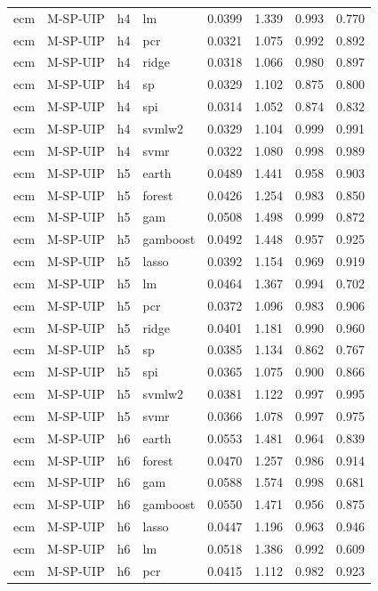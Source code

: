 \begin{ThreePartTable}
\begin{longtable}[t]{llclcccc}
ecm & M-SP-UIP & h4 & lm & 0.0399 & 1.339 & 0.993 & 0.770\\
ecm & M-SP-UIP & h4 & pcr & 0.0321 & 1.075 & 0.992 & 0.892\\
ecm & M-SP-UIP & h4 & ridge & 0.0318 & 1.066 & 0.980 & 0.897\\
ecm & M-SP-UIP & h4 & sp & 0.0329 & 1.102 & 0.875 & 0.800\\
ecm & M-SP-UIP & h4 & spi & 0.0314 & 1.052 & 0.874 & 0.832\\
ecm & M-SP-UIP & h4 & svmlw2 & 0.0329 & 1.104 & 0.999 & 0.991\\
ecm & M-SP-UIP & h4 & svmr & 0.0322 & 1.080 & 0.998 & 0.989\\
\addlinespace
ecm & M-SP-UIP & h5 & earth & 0.0489 & 1.441 & 0.958 & 0.903\\
ecm & M-SP-UIP & h5 & forest & 0.0426 & 1.254 & 0.983 & 0.850\\
ecm & M-SP-UIP & h5 & gam & 0.0508 & 1.498 & 0.999 & 0.872\\
ecm & M-SP-UIP & h5 & gamboost & 0.0492 & 1.448 & 0.957 & 0.925\\
ecm & M-SP-UIP & h5 & lasso & 0.0392 & 1.154 & 0.969 & 0.919\\
ecm & M-SP-UIP & h5 & lm & 0.0464 & 1.367 & 0.994 & 0.702\\
ecm & M-SP-UIP & h5 & pcr & 0.0372 & 1.096 & 0.983 & 0.906\\
ecm & M-SP-UIP & h5 & ridge & 0.0401 & 1.181 & 0.990 & 0.960\\
ecm & M-SP-UIP & h5 & sp & 0.0385 & 1.134 & 0.862 & 0.767\\
ecm & M-SP-UIP & h5 & spi & 0.0365 & 1.075 & 0.900 & 0.866\\
ecm & M-SP-UIP & h5 & svmlw2 & 0.0381 & 1.122 & 0.997 & 0.995\\
ecm & M-SP-UIP & h5 & svmr & 0.0366 & 1.078 & 0.997 & 0.975\\
\addlinespace
ecm & M-SP-UIP & h6 & earth & 0.0553 & 1.481 & 0.964 & 0.839\\
ecm & M-SP-UIP & h6 & forest & 0.0470 & 1.257 & 0.986 & 0.914\\
ecm & M-SP-UIP & h6 & gam & 0.0588 & 1.574 & 0.998 & 0.681\\
ecm & M-SP-UIP & h6 & gamboost & 0.0550 & 1.471 & 0.956 & 0.875\\
ecm & M-SP-UIP & h6 & lasso & 0.0447 & 1.196 & 0.963 & 0.946\\
ecm & M-SP-UIP & h6 & lm & 0.0518 & 1.386 & 0.992 & 0.609\\
ecm & M-SP-UIP & h6 & pcr & 0.0415 & 1.112 & 0.982 & 0.923\\

\end{longtable}
\end{ThreePartTable}
